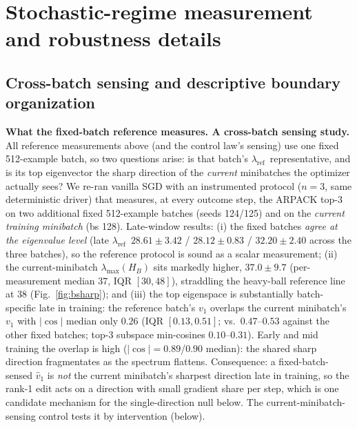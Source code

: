 \documentclass{article}
\theoremstyle{plain}
\theoremstyle{definition}
\theoremstyle{remark}
\newcommand{\lmax}{\lambda_{\max}}
\newcommand{\lref}{\ensuremath{\lambda_{\mathrm{ref}}}}
\begin{document}
\FloatBarrier

\section{Stochastic-regime measurement and robustness details}
\label{app:stoch}

\subsection{Cross-batch sensing and descriptive boundary organization}\label{sub:crossbatch}
\textbf{What the fixed-batch reference measures. A cross-batch
sensing study.} All reference measurements above (and the control law's
sensing) use one fixed 512-example batch, so two questions arise: is that
batch's \lref\ representative, and is its top eigenvector the sharp
direction of the \emph{current} minibatches the optimizer actually sees?
We re-ran vanilla SGD with an instrumented protocol ($n{=}3$, same
deterministic driver) that measures, at every outcome step, the ARPACK
top-3 on two additional fixed 512-example batches (seeds 124/125) and on
the \emph{current training minibatch} (bs 128). Late-window results:
(i) the fixed batches \emph{agree at the eigenvalue level} (late \lref\
$28.61\pm3.42$ / $28.12\pm0.83$ / $32.20\pm2.40$ across the three
batches), so the reference protocol is sound as a scalar measurement;
(ii) the current-minibatch $\lmax(H_{B})$ sits markedly higher, $37.0\pm9.7$
(per-measurement median $37$, IQR $[30,48]$), straddling the heavy-ball
reference line at $38$ (Fig.~\ref{fig:bsharp}); and (iii) the top eigenspace is
substantially batch-specific late in training: the reference batch's
$v_{1}$ overlaps the current minibatch's $v_{1}$ with
$|\cos|$ median only $0.26$ (IQR $[0.13,0.51]$; vs.\ $0.47$--$0.53$
against the other fixed batches; top-3 subspace min-cosines
$0.10$--$0.31$). Early and mid training the overlap is high
($|\cos|\!=\!0.89$/$0.90$ median): the shared sharp direction
fragmentates as the spectrum flattens. Consequence: a fixed-batch-sensed
$\hat v_{1}$ is \emph{not} the current minibatch's sharpest direction
late in training, so the rank-1 edit acts on a direction with small
gradient share per step, which is one candidate mechanism for the
single-direction null below. The current-minibatch-sensing control
tests it by intervention (below).
\end{document}
